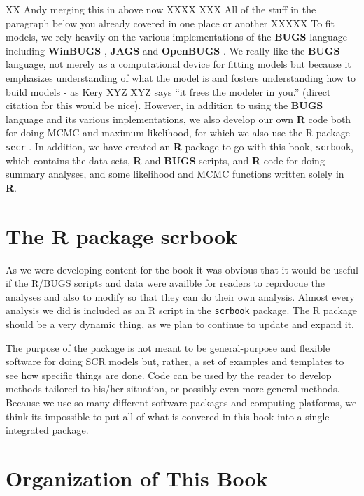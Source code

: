 XX Andy merging this in above now XXXX
XXX All of the stuff in the paragraph below you already covered in one place or another XXXXX
To fit models, we rely heavily on the various implementations of the
{\bf BUGS} language including {\bf WinBUGS} \citep{lunn_etal:2000},
{\bf JAGS} \citep{plummer:2003}
 and {\bf OpenBUGS} \citep{thomas_etal:2006}. We really like
the {\bf BUGS} language, not merely  as a computational device for
fitting models but because it emphasizes
understanding of what the model is and fosters understanding how to
build models - as Kery XYZ XYZ says ``it frees the modeler in you.''  (direct
citation for this would be nice).  However, in addition to using the
{\bf BUGS} language and its various implementations, we also develop our own
{\bf R} code both for doing MCMC
and maximum likelihood, for which we also use the R
package \mbox{\tt secr} \citep{efford:2011}. In addition, we have
created an {\bf R} package to go with this book, \mbox{\tt scrbook},
which contains the data sets, {\bf R} and {\bf BUGS} scripts, and {\bf
  R} code for doing summary analyses, and some likelihood and MCMC
functions written solely in {\bf R}.






\section*{The R package scrbook}

As we were developing content for the book it was obvious that it
would be useful if the R/BUGS scripts and data were availble for
readers to reprdocue the analyses and also to modify so that they can
do their own analysis.  Almost every analysis we did is included as an
R script in the \mbox{\tt scrbook} package.
The R package should be a very dynamic thing, as we plan to
continue to update and expand it.

The purpose of the package is not meant to be general-purpose and
flexible software for doing SCR models but, rather, a set of examples
and templates to see how specific things are done. Code can be used
by the reader to develop methods tailored to his/her situation, or
possibly even more general methods.  Because we use so many different
software packages and computing platforms, we think its impossible to
put all of what is convered in this book into a single integrated
package. 


\section*{Organization of This Book}


